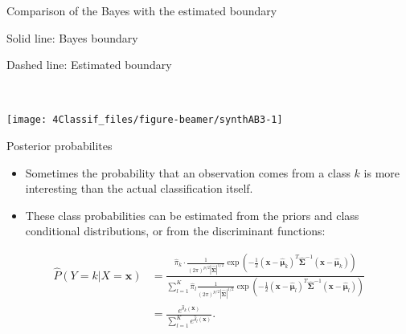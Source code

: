 \documentclass[
  10pt,
  ignorenonframetext,
]{beamer}
\providecommand{\tightlist}{%
  \setlength{\itemsep}{0pt}\setlength{\parskip}{0pt}}
\begin{document}
\begin{frame}
\begin{block}{Comparison of the Bayes with the estimated boundary}
\protect\hypertarget{comparison-of-the-bayes-with-the-estimated-boundary}{}
\vspace{2mm}

Solid line: Bayes boundary

Dashed line: Estimated boundary

\(~\)

\begin{center}\texttt{[image: 4Classif\_files/figure-beamer/synthAB3-1]} \end{center}
\end{block}
\end{frame}

\begin{frame}
\begin{block}{Posterior probabilites}
\protect\hypertarget{posterior-probabilites}{}
\vspace{2mm}

\begin{itemize}
\tightlist
\item
  Sometimes the probability that an observation comes from a class \(k\)
  is more interesting than the actual classification itself.
\end{itemize}

\vspace{2mm}

\begin{itemize}
\tightlist
\item
  These class probabilities can be estimated from the priors and class
  conditional distributions, or from the discriminant functions:
\end{itemize}

\begin{align*}\hat{P}(Y=k | X=\boldsymbol{x})&=
\frac{\hat{\pi}_k \cdot \frac{1}{(2 \pi)^{p/2}|\hat{\boldsymbol{\Sigma}}|^{1/2}} \exp(-\frac{1}{2}
(\boldsymbol{x}-\hat{\boldsymbol\mu}_k)^T \hat{\boldsymbol{\Sigma}}^{-1}
(\boldsymbol{x}-\hat{\boldsymbol\mu}_k))}
{\sum_{l=1}^K \hat{\pi}_l 
\frac{1}{(2 \pi)^{p/2}|\hat{\boldsymbol{\Sigma}}|^{1/2}}
\exp(-\frac{1}{2}
(\boldsymbol{x}-\hat{\boldsymbol\mu}_l)^T 
\hat{\boldsymbol{\Sigma}}^{-1}
(\boldsymbol{x}-\hat{\boldsymbol\mu}_l))}\\
&=
\frac{e^{\hat{\delta}_k(\boldsymbol{x})}}{\sum_{l=1}^K e^{\hat{\delta}_l(\boldsymbol{x})}}.\end{align*}
\end{block}
\end{frame}
\end{document}
